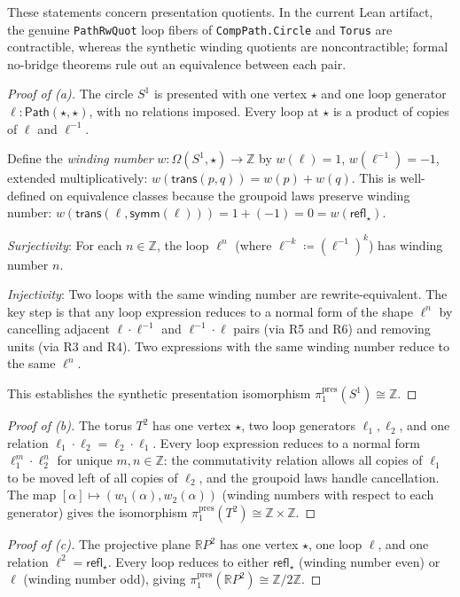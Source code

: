 \documentclass[manuscript]{BSLstyle}
\newcommand{\Path}{\mathsf{Path}}
\newcommand{\refl}{\mathsf{refl}}
\newcommand{\symm}{\mathsf{symm}}
\newcommand{\trans}{\mathsf{trans}}
\newcommand{\Z}{\mathbb{Z}}
\newcommand{\defeq}{\coloneqq}
\begin{document}
These statements concern presentation quotients.  In the current Lean
artifact, the genuine \texttt{PathRwQuot} loop fibers of
\texttt{CompPath.Circle} and \texttt{Torus} are contractible, whereas the
synthetic winding quotients are noncontractible; formal no-bridge theorems rule
out an equivalence between each pair.

\begin{proof}[Proof of (a)]
The circle $S^1$ is presented with one vertex $\star$ and one loop
generator $\ell : \Path(\star, \star)$, with no relations imposed.
Every loop at $\star$ is a product of copies of $\ell$ and $\ell^{-1}$.

Define the \emph{winding number} $w : \Omega(S^1, \star) \to \Z$ by
$w(\ell) = 1$, $w(\ell^{-1}) = -1$, extended multiplicatively:
$w(\trans(p, q)) = w(p) + w(q)$.  This is well-defined on equivalence
classes because the groupoid laws preserve winding number:
$w(\trans(\ell, \symm(\ell))) = 1 + (-1) = 0 = w(\refl_\star)$.

\emph{Surjectivity}: For each $n \in \Z$, the loop $\ell^n$ (where
$\ell^{-k} \defeq (\ell^{-1})^k$) has winding number $n$.

\emph{Injectivity}: Two loops with the same winding number are
rewrite-equivalent.  The key step is that any loop expression reduces
to a normal form of the shape $\ell^n$ by cancelling adjacent
$\ell \cdot \ell^{-1}$ and $\ell^{-1} \cdot \ell$ pairs (via R5 and R6)
and removing units (via R3 and R4).  Two expressions with the same
winding number reduce to the same $\ell^n$.

This establishes the synthetic presentation isomorphism
\(\pi_1^{\mathrm{pres}}(S^1) \cong \Z\).
\end{proof}

\begin{proof}[Proof of (b)]
The torus $T^2$ has one vertex $\star$, two loop generators $\ell_1, \ell_2$,
and one relation $\ell_1 \cdot \ell_2 = \ell_2 \cdot \ell_1$.
Every loop expression reduces to a normal form $\ell_1^{m} \cdot \ell_2^{n}$
for unique $m, n \in \Z$: the commutativity relation allows all copies of
$\ell_1$ to be moved left of all copies of $\ell_2$, and the groupoid laws
handle cancellation.  The map
$[\alpha] \mapsto (w_1(\alpha), w_2(\alpha))$ (winding numbers with
respect to each generator) gives the isomorphism
\(\pi_1^{\mathrm{pres}}(T^2) \cong \Z \times \Z\).
\end{proof}

\begin{proof}[Proof of (c)]
The projective plane $\mathbb{R}P^2$ has one vertex $\star$, one loop
$\ell$, and one relation $\ell^2 = \refl_\star$.  Every loop reduces to
either $\refl_\star$ (winding number even) or $\ell$ (winding number odd),
giving $\pi_1^{\mathrm{pres}}(\mathbb{R}P^2) \cong \Z/2\Z$.
\end{proof}
\end{document}
